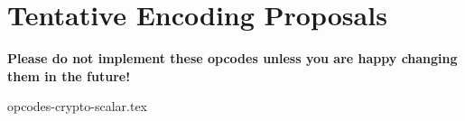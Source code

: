 
\newpage
\section{Tentative Encoding Proposals}

{\bf Please do not implement these opcodes unless you are happy changing
them in the future!}
\medskip

{opcodes-crypto-scalar.tex}

